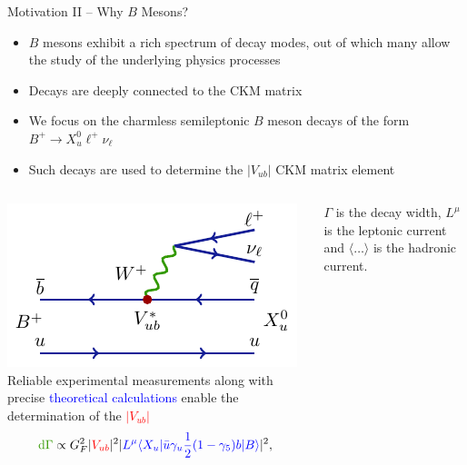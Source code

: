 \documentclass[serif]{beamer}
\begin{document}
\begin{frame}[t]{Motivation II -- Why $B$ Mesons?}
\small
\vspace{-3mm}
\begin{block}{}
	\begin{itemize}
		\item $B$ mesons exhibit a rich spectrum of decay modes, out of which many allow the study of the underlying physics processes
		\item Decays are deeply connected to the CKM matrix
	\end{itemize}
\end{block}

\begin{exampleblock}{}
	\begin{itemize}
		\item We focus on the charmless semileptonic $B$ meson decays of the form $B^+ \to X_u^0 \ell^+ \nu_\ell$
		\item Such decays are used to determine the $\vert V_{ub}\vert$ CKM matrix element
	\end{itemize}
\end{exampleblock}

\begin{columns}
	\includegraphics[scale=1]{texfig/B2pilnu_short}
	Reliable \textcolor{turtlegreen}{experimental measurements} along with precise \textcolor{blue}{theoretical calculations} enable the determination of the \textcolor{red}{$\vert  V_{ub} \vert$}
	\begin{equation*}
	\textcolor{turtlegreen}{\mathrm{d} \Gamma} \propto G_F^2 \vert \textcolor{red}{ V_{ub}} \vert ^2 \vert \textcolor{blue}{L^\mu \langle X_u \vert \bar u \gamma_u \frac{1}{2} (1-\gamma_5) b \vert B \rangle} \vert ^2,
	\end{equation*}
	
$\Gamma$ is the decay width, $L^\mu$ is the leptonic current and $\langle \dots \rangle$ is the hadronic current.
\end{columns}
\end{frame}
\end{document}
